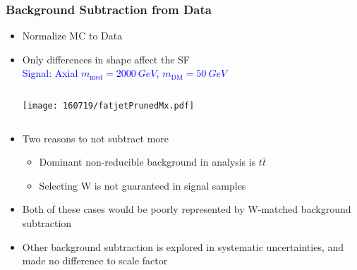 \documentclass{beamer}
\begin{document}
\begin{frame}
  \frametitle{Background Subtraction from Data}
  \begin{itemize}
  \item Normalize MC to Data
  \item Only differences in shape affect the SF \vspace{-2pt} \\
    \textcolor{blue}{\scriptsize \hspace{-35pt} Signal: Axial
      $m_\text{med} = \SI{2000}{GeV}$,
      $m_\text{DM} = \SI{50}{GeV}$}
    \begin{columns}
      \begin{column}{0.4\linewidth}
        \centering
        \texttt{[image: 160719/fatjetPrunedMx.pdf]}
      \end{column}
    \end{columns}
  \item Two reasons to not subtract more
    \begin{itemize}
    \item Dominant non-reducible background in analysis is $t\bar{t}$
    \item Selecting W is not guaranteed in signal samples
    \end{itemize}
  \item Both of these cases would be poorly represented by
    W-matched background subtraction
  \item Other background subtraction is explored in systematic uncertainties, 
    and made no difference to scale factor
  \end{itemize}
\end{frame}
\end{document}

